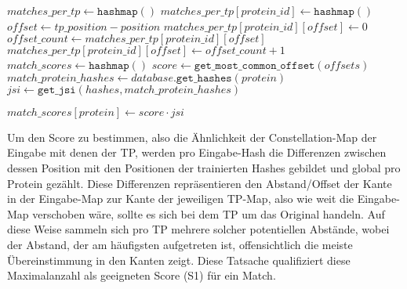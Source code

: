 \begin{enumerate}[a)]
\begin{minipage}{\Width}
\begin{algorithm}[H]
\begin{algorithmic}
                        \State $matches\_per\_tp \gets \texttt{hashmap}()$
                                        \State $matches\_per\_tp[protein\_id] \gets \texttt{hashmap}()$
                                    \EndIf
                                    \State $offset \gets tp\_position - position$
                                        \State $matches\_per\_tp[protein\_id][offset] \gets 0$
                                    \EndIf
                                    \State $offset\_count \gets matches\_per\_tp[protein\_id][offset]$
                                    \State $matches\_per\_tp[protein\_id][offset] \gets offset\_count + 1$
                                \EndFor
                            \EndIf
                        \EndFor
                        \State $match\_scores \gets \texttt{hashmap}()$
                            \State $score \gets \texttt{get\_most\_common\_offset}(offsets)$
                            \State $match\_protein\_hashes \gets database.\texttt{get\_hashes}(protein)$
                            \State $jsi \gets \texttt{get\_jsi}(hashes, match\_protein\_hashes)$

                            \State $match\_scores[protein] \gets score \cdot jsi$
                        \EndFor
                    \end{algorithmic}
                \end{algorithm}
            \end{minipage}

            Um den Score zu bestimmen, also die Ähnlichkeit der Constellation-Map der Eingabe mit denen der \ac{TP}, werden pro Eingabe-Hash die Differenzen zwischen dessen Position mit den Positionen der trainierten Hashes gebildet und global pro Protein gezählt. Diese Differenzen repräsentieren den Abstand/Offset der Kante in der Eingabe-Map zur Kante der jeweiligen \ac{TP}-Map, also wie weit die Eingabe-Map verschoben wäre, sollte es sich bei dem \ac{TP} um das Original handeln. Auf diese Weise sammeln sich pro \ac{TP} mehrere solcher potentiellen Abstände, wobei der Abstand, der am häufigsten aufgetreten ist, offensichtlich die meiste Übereinstimmung in den Kanten zeigt. Diese Tatsache qualifiziert diese Maximalanzahl als geeigneten Score (S1) für ein Match.


\end{enumerate}

